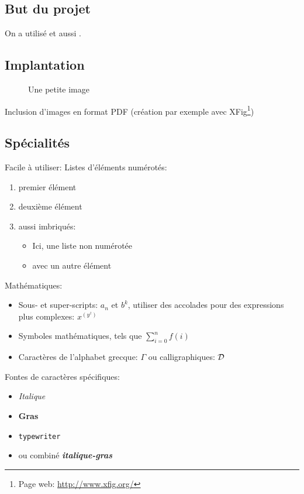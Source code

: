 \documentclass{article}
\begin{document}
\subsection{But du projet}
On a utilisé
\cite{lindholm99_java_virtual_machin_specif,moore89_system_verif} et
aussi \cite{strecker02_verif_java_compil}.

\subsection{Implantation}

\begin{figure}[htbp]
  \centering
  \caption{Une petite image}
  \label{fig:im}
\end{figure}

Inclusion d'images en format PDF (création par exemple avec
XFig\footnote{Page web: \url{http://www.xfig.org/}})

\subsection{Spécialités}

Facile à utiliser: Listes d'éléments numérotés:
\begin{enumerate}
\item premier élément
\item deuxième élément
\item aussi imbriqués:
%
\begin{itemize}
\item Ici, une liste non numérotée
\item avec un autre élément
\end{itemize}
%
\end{enumerate}

Mathématiques:
\begin{itemize}
\item Sous- et super-scripts: $a_n$ et $b^k$, utiliser des accolades
  pour des expressions plus complexes: $x^{(y^z)}$

\item Symboles mathématiques, tels que $\sum_{i=0}^{n} f(i)$

\item Caractères de l'alphabet grecque: $\Gamma$ ou calligraphiques: ${\cal D}$
\end{itemize}

Fontes de caractères spécifiques:
\begin{itemize}
\item \emph{Italique}
\item \textbf{Gras}
\item \texttt{typewriter}
\item ou combiné \emph{\textbf{italique-gras}}
\end{itemize}
\end{document}
